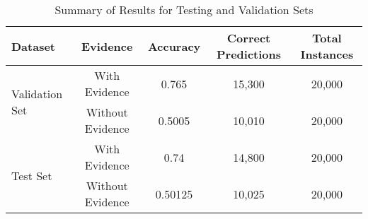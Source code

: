 \documentclass[conference]{IEEEtran}
\begin{document}
\begin{table}[t] %
\centering
\begin{tabular}{|l|c|c|c|c|}
\hline
\textbf{Dataset} & \textbf{Evidence} & \textbf{Accuracy} & \textbf{Correct Predictions} & \textbf{Total Instances} \\
\hline
\multirow{2}{*}{Validation Set} & With Evidence & 0.765 & 15,300 & 20,000 \\
\cline{2-5}
& Without Evidence & 0.5005 & 10,010 & 20,000 \\
\hline
\multirow{2}{*}{Test Set} & With Evidence & 0.74 & 14,800 & 20,000 \\
\cline{2-5}
& Without Evidence & 0.50125 & 10,025 & 20,000 \\
\hline
\end{tabular}
\caption{Summary of Results for Testing and Validation Sets}
\label{tab:summary_results}
\end{table}
\end{document}
